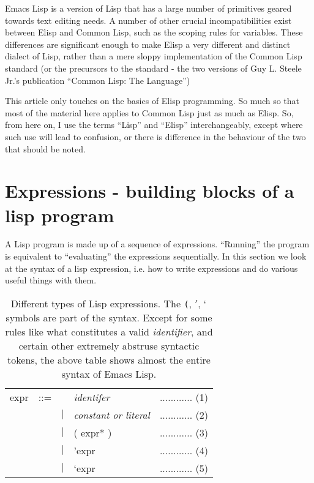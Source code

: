 \documentclass[10pt]{article}
\begin{document}
Emacs Lisp is a version of Lisp that has a large number of primitives geared
towards text editing needs.  A number of other crucial incompatibilities exist
between Elisp and Common Lisp, such as the scoping rules for variables.  These
differences are significant enough to make Elisp a very different and distinct
dialect of Lisp, rather than a mere sloppy implementation of the Common Lisp
standard (or the precursors to the standard - the two versions of Guy L. Steele
Jr.'s publication ``Common Lisp: The Language'')

This article only touches on the basics of Elisp programming.  So much so that
most of the material here applies to Common Lisp just as much as Elisp.  So,
from here on, I use the terms ``Lisp'' and ``Elisp'' interchangeably, except
where such use will lead to confusion, or there is difference in the behaviour
of the two that should be noted.

\section{Expressions - building blocks of a lisp program}

A Lisp program is made up of a sequence of expressions.  ``Running'' the
program is equivalent to ``evaluating'' the expressions sequentially.  In this
section we look at the syntax of a lisp expression, i.e. how to write
expressions and do various useful things with them.

\begin{table}[tb]
  \centering
  \begin{tabular}{|l l l l l|} \hline
  expr & ::= &           & \textit{identifer}           & ............ (1) \\
       &     &  $\vert$  & \textit{constant or literal} & ............ (2) \\
       &     &  $\vert$  & ( expr* )                    & ............ (3) \\
       &     &  $\vert$  & 'expr                        & ............ (4) \\
       &     &  $\vert$  & `expr                        & ............ (5) \\
  \hline
  \end{tabular}
  \caption{Different types of Lisp expressions.  The \texttt{(},
       \texttt{$'$}, \texttt{$`$} symbols are part of the syntax.
       Except for some rules like what constitutes a valid \textit{identifier},
       and certain other extremely abstruse syntactic tokens, the above table
       shows almost the entire syntax of Emacs Lisp.}
  \label{tab:exprs}
\end{table}
\end{document}
